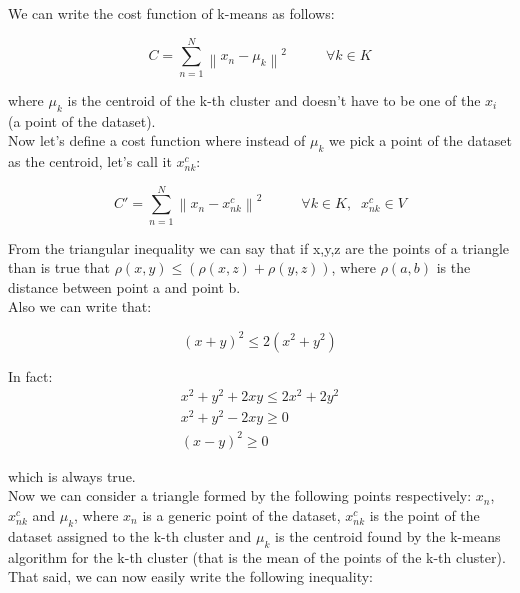 \documentclass{article}
\newcommand{\norm}[1]{\left\lVert#1\right\rVert}
\begin{document}
We can write the cost function of k-means as follows:

\begin{equation} \label{eq:kmeans_cost}
C = \sum_{n=1}^{N} \norm{x_{n} - \mu_{k}}^2		\;\;\;\;\;\;\;\;\;\;		\forall k \in K
\end{equation}

where $\mu_{k}$ is the centroid of the k-th cluster and doesn't have to be one of the $x_{i}$ (a point of the dataset). \\

Now let's define a cost function where instead of $\mu_{k}$ we pick a point of the dataset as the centroid, let's call it $x_{nk}^{c}$:

\begin{equation} \label{eq:kmedoid_cost1}
C' = \sum_{n=1}^{N} \norm{x_{n} - x_{nk}^{c}}^2		\;\;\;\;\;\;\;\;\;\;		\forall k \in K, \;\;  x_{nk}^{c} \in V
\end{equation}


From the triangular inequality we can say that if x,y,z are the points of a triangle than is true that $\rho(x,y) \leq (\rho(x,z) + \rho(y,z))$, where $\rho(a,b)$ is the distance between point a and point b. \\
Also we can write that:

\begin{equation} \label{eq:emi_ineq}
(x+y)^2 \leq 2(x^2 + y^2)
\end{equation}

In fact:
\begin{equation} \label{eq:emi_ineq2}
\begin{split}
x^2 + y^2 + 2xy \leq 2x^2 + 2y^2	\\
x^2 + y^2 - 2xy \geq 0		\\
(x-y)^2  \geq  0
\end{split}
\end{equation}

which is always true. \\

Now we can consider a triangle formed by the following points respectively: $x_{n}$, $x_{nk}^{c}$ and $\mu_{k}$, where $x_{n}$ is a generic point of the dataset, $x_{nk}^{c}$ is the point of 
the dataset assigned to the k-th cluster and $\mu_{k}$ is the centroid found by the k-means algorithm for the k-th cluster (that is the mean of the points of the k-th cluster). \\

That said, we can now easily write the following inequality:
\end{document}
